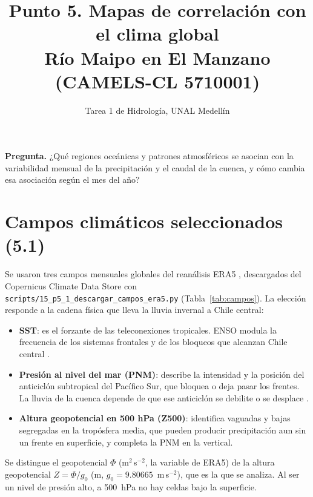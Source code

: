 \documentclass[11pt,letterpaper]{article}
\title{Punto 5. Mapas de correlación con el clima global\\
\large Río Maipo en El Manzano (CAMELS-CL 5710001)}
\author{Tarea 1 de Hidrología, UNAL Medellín}
\date{}
\begin{document}
\sloppy
\maketitle

\noindent\textbf{Pregunta.} ¿Qué regiones oceánicas y patrones atmosféricos se asocian con la variabilidad mensual
de la precipitación y el caudal de la cuenca, y cómo cambia esa asociación según el mes del año?

\section{Campos climáticos seleccionados (5.1)}

Se usaron tres campos mensuales globales del reanálisis ERA5 \citep{Hersbach2020}, descargados del Copernicus
Climate Data Store con \texttt{scripts/15\_p5\_1\_descargar\_campos\_era5.py} (Tabla~\ref{tab:campos}). La
elección responde a la cadena física que lleva la lluvia invernal a Chile central:
\begin{itemize}
\item \textbf{SST}: es el forzante de las teleconexiones tropicales. ENSO modula la frecuencia de los
sistemas frontales y de los bloqueos que alcanzan Chile central \citep{Rutllant1991,Montecinos2003}.
\item \textbf{Presión al nivel del mar (PNM)}: describe la intensidad y la posición del anticiclón subtropical
del Pacífico Sur, que bloquea o deja pasar los frentes. La lluvia de la cuenca depende de que ese
anticiclón se debilite o se desplace \citep{Garreaud2009}.
\item \textbf{Altura geopotencial en 500 hPa (Z500)}: identifica vaguadas y bajas segregadas en la tropósfera
media, que pueden producir precipitación aun sin un frente en superficie, y completa la PNM en la vertical.
\end{itemize}
Se distingue el geopotencial $\Phi$ (m$^2$\,s$^{-2}$, la variable de ERA5) de la altura geopotencial
$Z=\Phi/g_0$ (m, $g_0=9.80665$~m\,s$^{-2}$), que es la que se analiza. Al ser un nivel de presión alto, a
500~hPa no hay celdas bajo la superficie.
\end{document}
